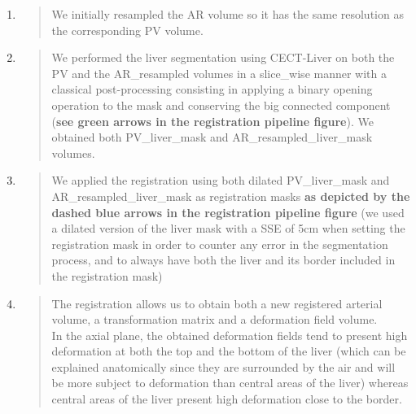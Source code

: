\documentclass[]{article}
\begin{document}
\begin{enumerate}
\def\labelenumi{\arabic{enumi}.}
\item
  \begin{quote}
  We initially resampled the AR volume so it has the same resolution as
  the corresponding PV volume.
  \end{quote}
\item
  \begin{quote}
  We performed the liver segmentation using CECT-Liver on both the PV
  and the AR\_resampled volumes in a slice\_wise manner with a classical
  post-processing consisting in applying a binary opening operation to
  the mask and conserving the big connected component (\textbf{see green
  arrows in the registration pipeline figure}). We obtained both
  PV\_liver\_mask and AR\_resampled\_liver\_mask volumes.
  \end{quote}
\item
  \begin{quote}
  We applied the registration using both dilated PV\_liver\_mask and
  AR\_resampled\_liver\_mask as registration masks \textbf{as depicted
  by the dashed blue arrows in the registration pipeline figure} (we
  used a dilated version of the liver mask with a SSE of 5cm when
  setting the registration mask in order to counter any error in the
  segmentation process, and to always have both the liver and its border
  included in the registration mask)
  \end{quote}
\item
  \begin{quote}
  The registration allows us to obtain both a new registered arterial
  volume, a transformation matrix and a deformation field volume.\\
  In the axial plane, the obtained deformation fields tend to present
  high deformation at both the top and the bottom of the liver (which
  can be explained anatomically since they are surrounded by the air and
  will be more subject to deformation than central areas of the liver)
  whereas central areas of the liver present high deformation close to
  the border.
  \end{quote}
\end{enumerate}
\end{document}
